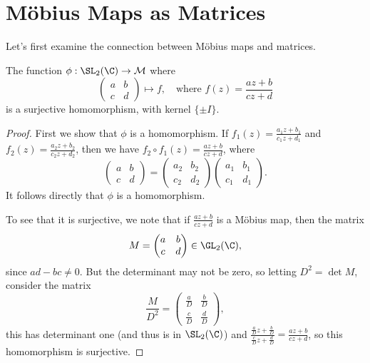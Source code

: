 \documentclass[a4]{scrreprt}
\begin{document}
\section{Möbius Maps as Matrices}

Let's first examine the connection between Möbius maps and matrices.

\begin{proposition}
	The function $\phi : \SL_2(\C) \rightarrow \mathcal{M}$ where 
	$$
		\begin{pmatrix}
			a & b \\ c & d
		\end{pmatrix} \longmapsto f, \quad \text{where } f(z) = \frac{az + b}{cz + d} 
	$$
	is a surjective homomorphism, with kernel $\{\pm I\}$.
\end{proposition}
\begin{proof}
	First we show that $\phi$ is a homomorphism. If $f_1(z) = \frac{a_1 z + b_1}{c_1 z + d_1}$ and $f_2(z) = \frac{a_2 z + b_2}{c_2 z + d_2}$, then we have $f_2 \circ f_1(z) = \frac{az + b}{cz + d}$, where
	$$
	\begin{pmatrix}
		a & b \\
		c & d
		\end{pmatrix}=\begin{pmatrix}
		a_{2} & b_{2} \\
		c_2 & d_{2}
		\end{pmatrix}\begin{pmatrix}
		a_{1} & b_{1} \\
		c_{1} & d_{1}
		\end{pmatrix}.
	$$
	It follows directly that $\phi$ is a homomorphism.

	To see that it is surjective, we note that if $\frac{az + b}{cz + d}$ is a Möbius map, then the matrix
	$$
	M = \begin{pmatrix}
		a & b \\
		c & d
		\end{pmatrix} \in \GL_2(\C),
	$$
	since $ad - bc \neq 0$. But the determinant may not be zero, so letting $D^2= \det M$, consider the matrix
	$$
	\frac{M}{D^2} = \begin{pmatrix}
		\frac{a}{D} & \frac{b}{D} \\
		\frac{c}{D} & \frac{d}{D}
		\end{pmatrix},
	$$
	this has determinant one (and thus is in $\SL_2(\C)$) and $\frac{\frac{a}{D}z + \frac{b}{D}}{\frac{c}{D}z + \frac{d}{D}} = \frac{az + b}{cz + d}$, so this homomorphism is surjective.


\end{proof}
\end{document}
